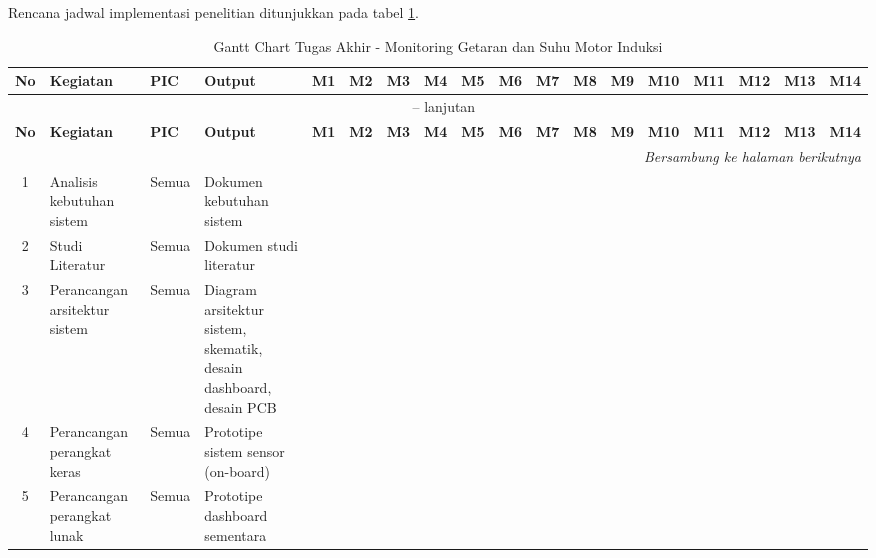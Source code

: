 \documentclass{elsinta}
\newcommand{\pk}{\cellcolor{ganttblue}\textcolor{white}{\checkmark}}
\begin{document}
Rencana jadwal implementasi penelitian ditunjukkan pada tabel \ref{tab:gantt}.

\begingroup
\scriptsize
\setlength{\tabcolsep}{2pt}
\renewcommand{\arraystretch}{1.3}
\begin{longtable}{|c|p{2.5cm}|p{1.6cm}|p{2.4cm}|*{14}{c|}}

\caption{Gantt Chart Tugas Akhir - Monitoring Getaran dan Suhu Motor Induksi} \label{tab:gantt} \\

\hline
\textbf{No} & \textbf{Kegiatan} & \textbf{PIC} & \textbf{Output} &
\textbf{M1} & \textbf{M2} & \textbf{M3} & \textbf{M4} & \textbf{M5} & \textbf{M6} &
\textbf{M7} & \textbf{M8} & \textbf{M9} & \textbf{M10} & \textbf{M11} & \textbf{M12} &
\textbf{M13} & \textbf{M14} \\
\hline
\endfirsthead

\multicolumn{18}{c}{{\tablename\ \thetable{} -- lanjutan}} \\
\hline
\textbf{No} & \textbf{Kegiatan} & \textbf{PIC} & \textbf{Output} &
\textbf{M1} & \textbf{M2} & \textbf{M3} & \textbf{M4} & \textbf{M5} & \textbf{M6} &
\textbf{M7} & \textbf{M8} & \textbf{M9} & \textbf{M10} & \textbf{M11} & \textbf{M12} &
\textbf{M13} & \textbf{M14} \\
\hline
\endhead

\hline
\multicolumn{18}{r}{\textit{Bersambung ke halaman berikutnya}} \\
\endfoot

\hline
\endlastfoot

1 & Analisis kebutuhan sistem & Semua & Dokumen kebutuhan sistem &
\pk & & & & & & & & & & & & & \\
\hline

2 & Studi Literatur & Semua & Dokumen studi literatur &
\pk & & & & & & & & & & & & & \\
\hline

3 & Perancangan arsitektur sistem & Semua & Diagram arsitektur sistem, skematik, desain dashboard, desain PCB &
& \pk & & & & & & & & & & & & \\
\hline

4 & Perancangan perangkat keras & Semua & Prototipe sistem sensor (on-board) &
& \pk & & & & & & & & & & & & \\
\hline

5 & Perancangan perangkat lunak & Semua & Prototipe dashboard sementara &
& \pk & & & & & & & & & & & & \\
\hline


\end{longtable}
\end{document}
